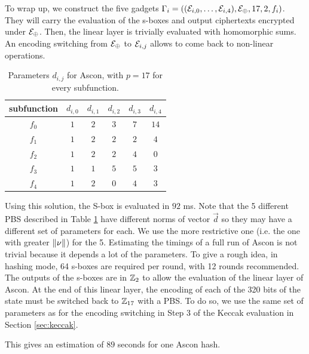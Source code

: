 To wrap up, we construct the five gadgets $\Gamma_i = \left ( (\mathcal{E}_{i,0}, \dots,  \mathcal{E}_{i, 4}), \mathcal{E}_\oplus, 17, 2, f_i \right )$. They will carry the evaluation of the s-boxes and output ciphertexts encrypted under $\mathcal{E}_\oplus$. Then, the linear layer is trivially evaluated with homomorphic sums. An encoding switching from $\mathcal{E}_\oplus$ to $\mathcal{E}_{i, j}$ allows to come back to non-linear operations.




\begin{table}[]
    \centering
    \begin{tabular}{|c|c|c|c|c|c|}
        \hline
       subfunction & $d_{i, 0}$ & $d_{i, 1}$ & $d_{i, 2}$ & $d_{i, 3}$ & $d_{i, 4}$\\
        \hline
        $f_0$  & $1$ & $2$ & $3$ & $7$ & $14$\\
        \hline
        $f_1$ & $1$ & $2$ & $2$ & $2$ & $4$\\
        \hline
        $f_2$ & $1$ & $2$ & $2$ & $4$ & $0$\\
        \hline
        $f_3$ & $1$ & $1$ & $5$ & $5$ & $3$\\
        \hline
        $f_4$ & $1$ & $2$ & $0$ & $4$ & $3$\\
        \hline
     \end{tabular}
    \caption{Parameters $d_{i, j}$ for Ascon, with $p=17$ for every subfunction.}
    \label{tab:encodings_ascon}
\end{table}


Using this solution, the S-box is evaluated in $92$ ms. Note that the 5 different \gls{PBS} described in Table \ref{tab:encodings_ascon} have different norms of vector $\vec d$ so they may have a different set of parameters for each. We use the more restrictive one (i.e. the one with greater $\lVert \nu \rVert$) for the 5. Estimating the timings of a full run of Ascon is not trivial because it depends a lot of the parameters. To give a rough idea, in hashing mode, 64 s-boxes are required per round, with 12 rounds recommended. The outputs of the s-boxes are in $\mathbb{Z}_2$ to allow the evaluation of the linear layer of Ascon. At the end of this linear layer, the encoding of each of the 320 bits of the state must be switched back to $\mathbb{Z}_{17}$ with a \gls{PBS}. To do so, we use the same set of parameters as for the encoding switching in Step 3 of the Keccak evaluation in Section \ref{sec:keccak}.

This gives an estimation of $89$ seconds for one Ascon hash.

